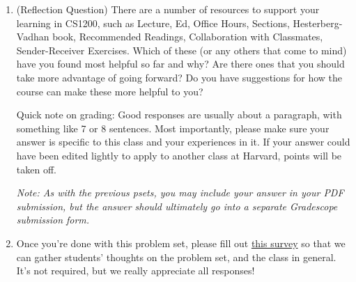 \documentclass[11pt]{article}
\begin{document}
\begin{enumerate}
\item (Reflection Question)  There are a number of resources to support your learning in CS1200, such as Lecture, Ed, Office Hours, Sections, Hesterberg-Vadhan book, Recommended Readings, Collaboration with Classmates, Sender-Receiver Exercises.  Which of these (or any others that come to mind) have you found most helpful so far and why?  Are there ones that you should take more advantage of going forward?  Do you have suggestions for how the course can make these more helpful to you?

Quick note on grading: Good responses are usually about a paragraph, with something like 7 or 8 sentences. Most importantly, please make sure your answer is specific to this class and your experiences in it. If your answer could have been edited lightly to apply to another class at Harvard, points will be taken off.

\textit{Note: As with the previous psets, you may include your answer in your PDF submission, but the answer should ultimately go into a separate Gradescope submission form.}

\item Once you're done with this problem set, please fill out \href{https://forms.gle/D1v2oEsnV9TPNoVt8}{this survey} so that we can gather students' thoughts on the problem set, and the class in general. It's not required, but we really appreciate all responses!
\end{enumerate}
\end{document}
